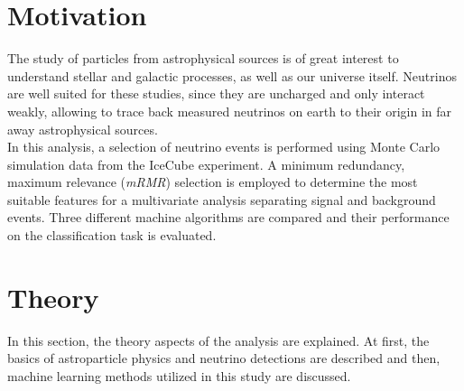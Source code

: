 \section{Motivation}
The study of particles from astrophysical sources is of great interest to understand stellar and galactic processes, as well as our universe itself.
Neutrinos are well suited for these studies, since they are uncharged and only interact weakly, allowing to trace back measured neutrinos on earth to their origin
in far away astrophysical sources. \\
In this analysis, a selection of neutrino events is performed using Monte Carlo simulation data from the IceCube experiment. 
A minimum redundancy, maximum relevance (\textit{mRMR}) selection is employed to determine the most suitable features for a multivariate analysis 
separating signal and background events. Three different machine algorithms are compared and their performance on the classification task is evaluated.


\section{Theory}
\label{sec:Theory}
In this section, the theory aspects of the analysis are explained.
At first, the basics of astroparticle physics and neutrino detections are described and then, machine learning methods utilized in this study are discussed. 

